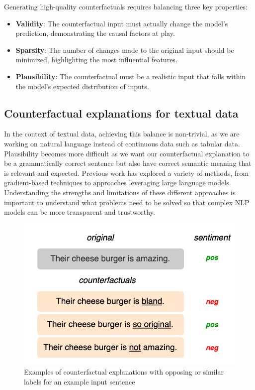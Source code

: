 Generating high-quality counterfactuals requires balancing three key properties: \cite{mcaleese_comparative_2024}
\begin{itemize}
    \item \textbf{Validity}: The counterfactual input must actually change the model's prediction, demonstrating the causal factors at play.
    \item \textbf{Sparsity}: The number of changes made to the original input should be minimized, highlighting the most influential features.
    \item \textbf{Plausibility}: The counterfactual must be a realistic input that falls within the model's expected distribution of inputs.
\end{itemize}

\subsection{Counterfactual explanations for textual data}
In the context of textual data, achieving this balance is non-trivial, as we are working on natural language instead of continuous data such as tabular data. Plausibility becomes more difficult as we want our counterfactual explanation to be a grammatically correct sentence but also have correct semantic meaning that is relevant and expected. Previous work has explored a variety of methods, from gradient-based techniques to approaches leveraging large language models. Understanding the strengths and limitations of these different approaches is important to understand what problems need to be solved so that complex NLP models can be more transparent and trustworthy.

\begin{figure}[h]
    \centering
    \includegraphics[width=0.5\linewidth]{ce_text.png}
    \caption{Examples of counterfactual explanations with opposing or similar labels for an example input sentence \cite{bhattacharjee_zero-shot_2024}}
    \label{fig:enter-label}
\end{figure}
 
